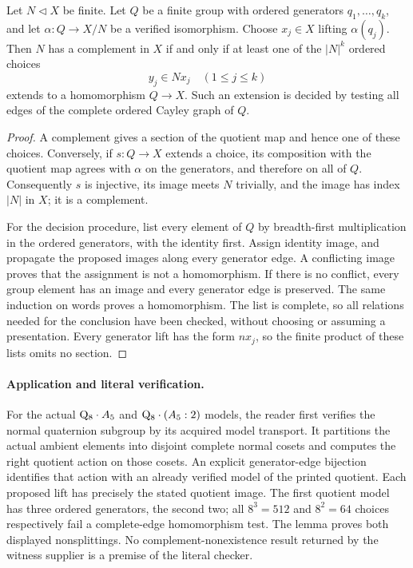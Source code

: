 \documentclass[11pt]{article}
\begin{document}
\begin{lemma}
Let $N\lhd X$ be finite. Let $Q$ be a finite group with ordered generators
$q_1,\ldots,q_k$, and let $\alpha:Q\longrightarrow X/N$ be a verified
isomorphism. Choose $x_j\in X$ lifting $\alpha(q_j)$. Then $N$ has a complement
in $X$ if and only if at least one of the $|N|^k$ ordered choices
\[
                     y_j\in Nx_j\quad(1\leq j\leq k)
\]
extends to a homomorphism $Q\to X$. Such an extension is decided by testing
all edges of the complete ordered Cayley graph of $Q$.
\end{lemma}
\begin{proof}
A complement gives a section of the quotient map and hence one of these
choices. Conversely, if $s:Q\to X$ extends a choice, its composition with
the quotient map agrees with $\alpha$ on the generators, and therefore on
all of $Q$. Consequently $s$ is injective, its image meets $N$ trivially,
and the image has index $|N|$ in $X$; it is a complement.

For the decision procedure, list every element of $Q$ by breadth-first
multiplication in the ordered generators, with the identity first. Assign
identity image, and propagate the proposed images along every generator
edge. A conflicting image proves that the assignment is not a homomorphism.
If there is no conflict, every group element has an image and every generator
edge is preserved. The same induction on words proves a homomorphism.
The list is complete, so all relations needed for the conclusion have been
checked, without choosing or assuming a presentation. Every generator lift
has the form $nx_j$, so the finite product of these lists omits no section.
\end{proof}
\newpage
\paragraph{Application and literal verification.}
For the actual $\mathrm Q_8\mathbin{\cdot}A_5$ and
$\mathrm Q_8\mathbin{\cdot}(A_5:2)$ models, the reader first verifies the normal
quaternion subgroup by its acquired model transport. It partitions the
actual ambient elements into disjoint complete normal cosets and computes
the right quotient action on those cosets. An explicit generator-edge
bijection identifies that action with an already verified model of the
printed quotient. Each proposed lift has precisely the stated quotient
image. The first quotient model has three ordered generators, the second
two; all $8^3=512$ and $8^2=64$ choices respectively fail a complete-edge
homomorphism test. The lemma proves both displayed nonsplittings. No
complement-nonexistence result returned by the witness supplier is a premise
of the literal checker.
\end{document}
